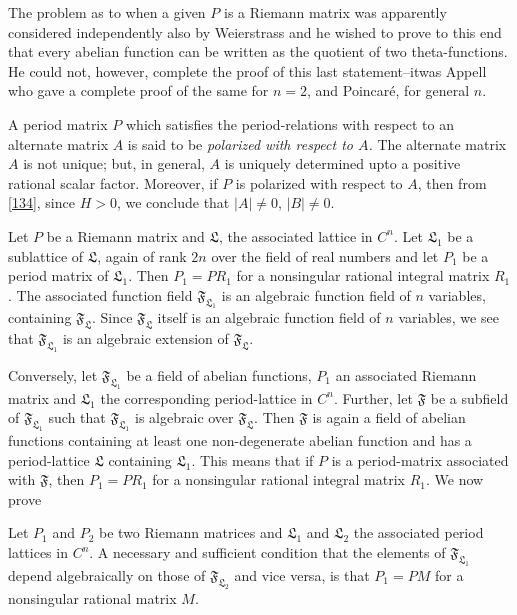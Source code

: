 The problem as to when a given $P$ is a Riemann matrix was apparently
considered independently also by Weierstrass and he wished to prove to
this end that every abelian function can be written as the quotient of
two theta-functions. He could not, however, complete the proof of this
last statement--it\pageoriginale was Appell who gave a complete proof
of the same for $n=2$, and Poincar\'e, for general $n$.

A period matrix $P$ which satisfies the period-relations with respect
to an alternate matrix $A$ is said to be {\em polarized with respect
  to $A$.} The alternate matrix $A$ is not unique; but, in general,
$A$ is uniquely determined upto a positive rational scalar
factor. Moreover, if $P$ is polarized with respect to $A$, then from
\eqref{134}, since $H>0$, we conclude that $|A|\neq 0$, $|B|\neq 0$.

Let $P$ be a Riemann matrix and $\mathfrak{L}$, the associated lattice
in $C^{n}$. Let $\mathfrak{L}_{1}$ be a sublattice of $\mathfrak{L}$,
again of rank $2n$ over the field of real numbers and let $P_{1}$ be a
period matrix of $\mathfrak{L}_{1}$. Then $P_{1}=PR_{1}$ for a
nonsingular rational integral matrix $R_{1}$. The associated function
field $\mathfrak{F}_{\mathfrak{L}_{1}}$ is an algebraic function field
of $n$ variables, containing $\mathfrak{F}_{\mathfrak{L}}$. Since
$\mathfrak{F}_{\mathfrak{L}}$ itself is an algebraic function field of
$n$ variables, we see that $\mathfrak{F}_{\mathfrak{L}_{1}}$ is an
algebraic extension of $\mathfrak{F}_{\mathfrak{L}}$.

Conversely, let $\mathfrak{F}_{\mathfrak{L}_{1}}$ be a field of
abelian functions, $P_{1}$ an associated Riemann matrix and
$\mathfrak{L}_{1}$ the corresponding period-lattice in
$C^{n}$. Further, let $\mathfrak{F}$ be a subfield of
$\mathfrak{F}_{\mathfrak{L}_{1}}$ such that
$\mathfrak{F}_{\mathfrak{L}_{1}}$ is algebraic over
$\mathfrak{F}_{\mathfrak{L}}$. Then $\mathfrak{F}$ is again a field of
abelian functions containing at least one non-degenerate abelian
function and has a period-lattice $\mathfrak{L}$ containing
$\mathfrak{L}_{1}$. This means that if $P$ is a period-matrix
associated with $\mathfrak{F}$, then $P_{1}=PR_{1}$ for a nonsingular
rational integral matrix $R_{1}$. We now prove

\begin{proposition}\label{prop19}
Let $P_{1}$ and $P_{2}$ be two Riemann matrices and $\mathfrak{L}_{1}$
and $\mathfrak{L}_{2}$ the associated period lattices in $C^{n}$. A
necessary and sufficient condition that the elements of
$\mathfrak{F}_{\mathfrak{L}_{1}}$ depend algebraically on those of
$\mathfrak{F}_{\mathfrak{L}_{2}}$ and vice versa, is that $P_{1}=PM$
for a nonsingular rational matrix $M$.
\end{proposition}


